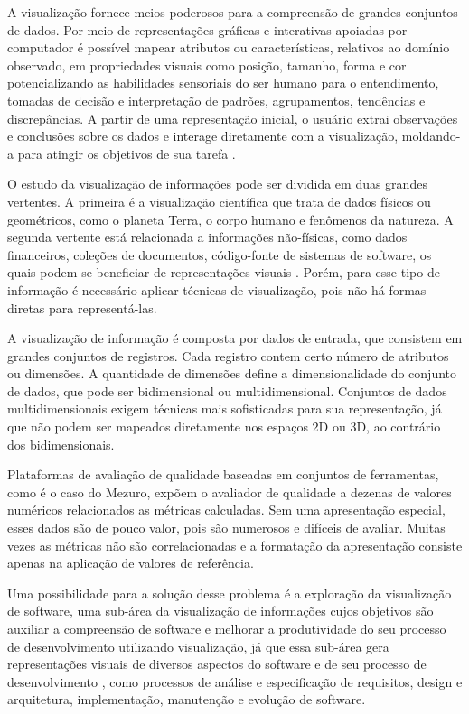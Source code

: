 A visualização fornece meios poderosos para a compreensão de grandes conjuntos de dados. Por meio de representações gráficas e interativas apoiadas por computador é possível mapear atributos ou características, relativos ao domínio observado, em propriedades visuais como posição, tamanho, forma e cor potencializando as habilidades sensoriais do ser humano para o entendimento, tomadas de decisão e interpretação de padrões, agrupamentos, tendências e discrepâncias. A partir de uma representação inicial, o usuário extrai observações e conclusões sobre os dados e interage diretamente com a visualização, moldando-a para atingir os objetivos de sua tarefa \cite{rafaelmessiasmartins2012}.

O estudo da visualização de informações pode ser dividida em duas grandes vertentes. A primeira é a visualização científica que trata de dados físicos ou geométricos, como o planeta Terra, o corpo humano e fenômenos da natureza. A segunda vertente está relacionada a informações não-físicas, como dados financeiros, coleções de documentos, código-fonte de sistemas de software, os quais podem se beneficiar de representações visuais \cite{rafaelmessiasmartins2012}. Porém, para esse tipo de informação é necessário aplicar técnicas de visualização, pois não há formas diretas para representá-las. %

A visualização de informação é composta por dados de entrada, que consistem em grandes conjuntos de registros. Cada registro contem certo número de atributos ou dimensões. A quantidade de dimensões define a dimensionalidade do conjunto de dados, que pode ser bidimensional ou multidimensional. Conjuntos de dados multidimensionais exigem técnicas mais sofisticadas para sua representação, já que não podem ser mapeados diretamente nos espaços 2D ou 3D, ao contrário dos bidimensionais.

Plataformas de avaliação de qualidade baseadas em conjuntos de ferramentas, como é o caso do Mezuro, expõem o avaliador de qualidade a dezenas de valores numéricos relacionados as métricas calculadas. Sem uma apresentação especial, esses dados são de pouco valor, pois são numerosos e difíceis de avaliar. Muitas vezes as métricas não são correlacionadas e a formatação da apresentação consiste apenas na aplicação de valores de referência.

Uma possibilidade para a solução desse problema é a exploração da visualização de software, uma sub-área da visualização de informações cujos objetivos são auxiliar a compreensão de software e melhorar a produtividade do seu processo de desenvolvimento utilizando visualização, já que essa sub-área gera representações visuais de diversos aspectos do software e de seu processo de desenvolvimento \cite{rafaelmessiasmartins2012}, como processos de análise e especificação de requisitos, design e arquitetura, implementação, manutenção e evolução de software.

